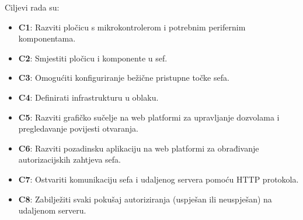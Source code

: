 Ciljevi rada su:

\begin{itemize}
    \item \textbf{C1}: Razviti pločicu s mikrokontrolerom i potrebnim perifernim komponentama.
    \item \textbf{C2}: Smjestiti pločicu i komponente u sef.
    \item \textbf{C3}: Omogućiti konfiguriranje bežične pristupne točke sefa.
    \item \textbf{C4}: Definirati infrastrukturu u oblaku.
    \item \textbf{C5}: Razviti grafičko sučelje na web platformi za upravljanje dozvolama i pregledavanje povijesti otvaranja.
    \item \textbf{C6}: Razviti pozadinsku aplikaciju na web platformi za obrađivanje autorizacijskih zahtjeva sefa.
    \item \textbf{C7}: Ostvariti komunikaciju sefa i udaljenog servera pomoću HTTP protokola.
    \item \textbf{C8}: Zabilježiti svaki pokušaj autoriziranja (uspješan ili neuspješan) na udaljenom serveru.
\end{itemize}
